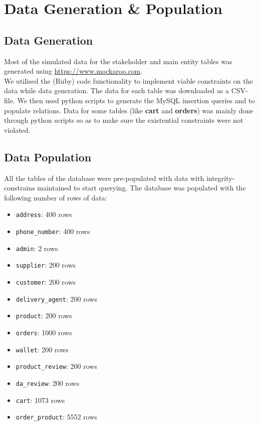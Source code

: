 \section*{\Huge Data Generation \& Population}
\subsection*{Data Generation}
Most of the simulated data for the stakeholder and main entity tables was generated using \href{https://www.mockaroo.com}{\color{blue}\underline{https://www.mockaroo.com}}. \\
\newline
We utilised the (Ruby) code functionality to implement viable constraints on the data while data generation.
The data for each table was downloaded as a CSV-file.
We then used python scripts to generate the MySQL insertion queries and to populate relations.
Data for some tables (like \textbf{cart} and \textbf{orders}) was mainly done through python scripts so as to make sure the existential constraints were not violated.

\subsection*{Data Population}
All the tables of the database were pre-populated with data with integrity-constrains maintained to start querying.
The database was populated with the following number of rows of data:
\begin{multicols}{2}
    \begin{itemize}
        \item \texttt{address}: 400 rows
        \item \texttt{phone\_number}: 400 rows
        \item \texttt{admin}: 2 rows
        \item \texttt{supplier}: 200 rows
        \item \texttt{customer}: 200 rows
        \item \texttt{delivery\_agent}: 200 rows
        \item \texttt{product}: 200 rows
        \item \texttt{orders}: 1000 rows
        \item \texttt{wallet}: 200 rows
        \item \texttt{product\_review}: 200 rows
        \item \texttt{da\_review}: 200 rows
        \item \texttt{cart}: 1073 rows
        \item \texttt{order\_product}: 5552 rows
    \end{itemize}
\end{multicols}

\pagebreak